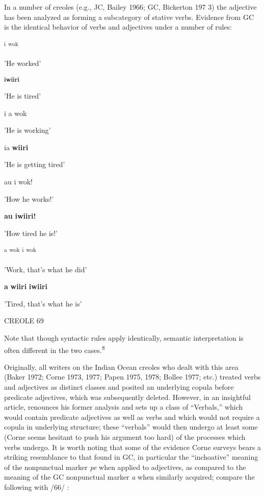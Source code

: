 In a number of creoles (e.g., JC, Bailey 1966; GC, Bickerton 197 3) the adjective has been analyzed as forming a subcategory of stative verbs. Evidence from GC is the identical behavior of verbs and adjectives under a number of rules:

\ea\label{ex:63}
 \textsuperscript{i} \textsuperscript{wok}
\glt
\z

'He worked'

\ea\label{ex:64}
 \textbf{\textsuperscript{i}}\textbf{\textsuperscript{wiiri}}
\glt
\z

'He is tired'

\ea\label{ex:65}
i a wok
\glt
\z

'He is working'

\ea\label{ex:66}
ia \textbf{wiiri}
\glt
\z

'He is getting tired'

\ea\label{ex:67}
au i wok!
\glt
\z

'How he works!'

\ea\label{ex:68}
\textbf{au} \textbf{i}\textbf{wiiri!}
\glt
\z

'How tired he is!'

\ea\label{ex:69}
 \textsuperscript{a} \textsuperscript{wok} \textsuperscript{i} \textsuperscript{wok}
\glt
\z

'Work, that's what he did'

\ea\label{ex:70}
\textbf{a} \textbf{wiiri} \textbf{i}\textbf{wiiri}
\glt
\z

'Tired, that's what he is' 

CREOLE 69

Note that though syntactic rules apply identically, semantic interpre\-tation is often different in the two cases.\textsuperscript{8}

Originally, all writers on the Indian Ocean creoles who dealt with this area (Baker 1972; Corne 1973, 1977; Papen 1975, 1978; Bollee 1977; etc.) treated verbs and adjectives as distinct classes and posited an underlying copula before predicate adjectives, which was subsequently deleted. However, in an insightful article, \citet{Corne1981} renounces his former analysis and sets up a class of ``Verbals,'' which would contain predicate adjectives as well as verbs and which would not require a copula in underlying structure; these ``verbals'' would then undergo at least some (Corne seems hesitant to push his argument too hard) of the processes which verbs undergo. It is worth noting that some of the evidence Corne surveys bears a striking resemblance to that found in GC, in particular the ``inchoative'' meaning of the nonpunctual marker \textit{pe} when applied to adjectives, as compared to the meaning of the GC nonpunctual marker \textit{a} when similarly acquired; compare the following with /66/ :


